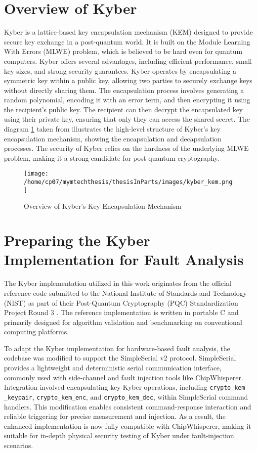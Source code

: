 \section{Overview of Kyber}
Kyber is a lattice-based key encapsulation mechanism (KEM) designed to provide secure key exchange in a post-quantum world. It is built on the Module Learning With Errors (MLWE) problem, which is believed to be hard even for quantum computers. Kyber offers several advantages, including efficient performance, small key sizes, and strong security guarantees.
Kyber operates by encapsulating a symmetric key within a public key, allowing two parties to securely exchange keys without directly sharing them. The encapsulation process involves generating a random polynomial, encoding it with an error term, and then encrypting it using the recipient's public key. The recipient can then decrypt the encapsulated key using their private key, ensuring that only they can access the shared secret.
The diagram \ref{fig:kyber_overview} taken from \cite{10.1145/3603170} illustrates the high-level structure of Kyber's key encapsulation mechanism, showing the encapsulation and decapsulation processes. The security of Kyber relies on the hardness of the underlying MLWE problem, making it a strong candidate for post-quantum cryptography.
\begin{figure}[h]
    \centering
    \texttt{[image: /home/cp07/mymtechthesis/thesisInParts/images/kyber\_kem.png]}
    \caption{Overview of Kyber's Key Encapsulation Mechanism}
    \label{fig:kyber_overview}
    

\end{figure}

\section{Preparing the Kyber Implementation for Fault Analysis}
The Kyber implementation utilized in this work originates from the official reference code submitted to the National Institute of Standards and Technology (NIST) as part of their Post-Quantum Cryptography (PQC) Standardization Project Round 3 \cite{nistpqc2020}. The reference implementation is written in portable C and primarily designed for algorithm validation and benchmarking on conventional computing platforms.

To adapt the Kyber implementation for hardware-based fault analysis, the codebase was modified to support the SimpleSerial v2 protocol. SimpleSerial provides a lightweight and deterministic serial communication interface, commonly used with side-channel and fault injection tools like ChipWhisperer. Integration involved encapsulating key Kyber operations, including \texttt{crypto\_kem
\_keypair}, \texttt{crypto\_kem\_enc}, and \texttt{crypto\_kem\_dec}, within SimpleSerial command handlers. This modification enables consistent command-response interaction and reliable triggering for precise measurement and injection. As a result, the enhanced implementation is now fully compatible with ChipWhisperer, making it suitable for in-depth physical security testing of Kyber under fault-injection scenarios.
